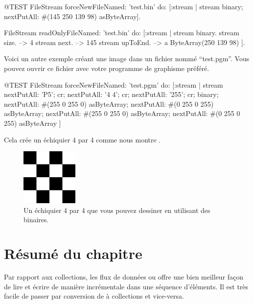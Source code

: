\documentclass[a4paper,10pt,twoside]{book}
\begin{document}
\begin{code}{@TEST}
FileStream
  forceNewFileNamed: 'test.bin'
  do: [:stream |
          stream
            binary;
            nextPutAll: #(145 250 139 98) asByteArray].

FileStream
  readOnlyFileNamed: 'test.bin'
  do: [:stream |
          stream binary.
          stream size.         --> 4
          stream next.         --> 145
          stream upToEnd. --> a ByteArray(250 139 98)
      ].
\end{code}

Voici un autre exemple cr\'eant une image dans un fichier nomm\'e
``test.pgm''. Vous pouvez ouvrir ce fichier avec votre programme de
graphisme pr\'ef\'er\'e.

\begin{code}{@TEST}
FileStream
  forceNewFileNamed: 'test.pgm' 
  do: [:stream |
	stream
		nextPutAll: 'P5'; cr;
		nextPutAll: '4 4'; cr;
		nextPutAll: '255'; cr;
		binary;
		nextPutAll: #(255 0 255 0) asByteArray;
		nextPutAll: #(0 255 0 255) asByteArray;
		nextPutAll: #(255 0 255 0) asByteArray;
		nextPutAll: #(0 255 0 255) asByteArray
	]
\end{code}

Cela cr\'ee un \'echiquier 4 par 4 comme nous montre .

\begin{figure}[!ht]
\centerline{\includegraphics[width=0.25\textwidth]{checkerboard4x4}}
\caption{Un \'echiquier 4 par 4 que vous pouvez dessiner en utilisant des \streams binaires.}
\label{fig:checkerboard4x4}
\vspace{.2in}
\end{figure}

\section{R\'esum\'e du chapitre}

Par rapport aux collections, les flux de donn\'ees ou \streams offre une bien meilleur fa\c{c}on de lire et \'ecrire de mani\`ere incr\'ementale dans une s\'equence d'\'el\'ements.
Il est tr\`es facile de passer par conversion de \streams \`a collections et vice-versa.
\end{document}
